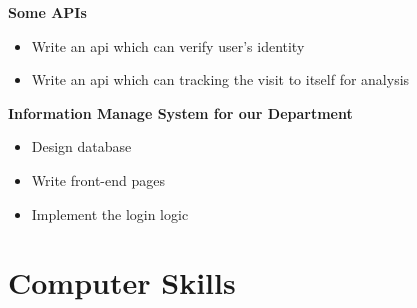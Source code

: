 \documentclass[11pt,a4paper,sans]{moderncv}
\begin{document}
          {\textbf{Some APIs}
            \begin{itemize}
              \item Write an api which can verify user's identity
              \item Write an api which can tracking the visit to itself for analysis
            \end{itemize}
          }

          {\textbf{Information Manage System for our Department}
            \begin{itemize}
              \item Design database
              \item Write front-end pages
              \item Implement the login logic
            \end{itemize}
          }

\section{Computer Skills}


\clearpage
\end{document}
